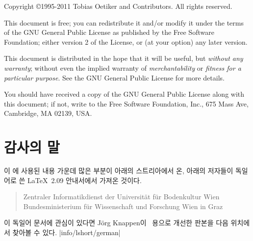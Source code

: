 \begin{small} 
  \noindent Copyright \copyright 1995-2011 Tobias Oetiker and Contributors.  All rights reserved.
 
  This document is free; you can redistribute it and/or modify it
  under the terms of the GNU General Public License as published by
  the Free Software Foundation; either version 2 of the License, or
  (at your option) any later version.
  
  This document is distributed in the hope that it will be useful, but
  \emph{without any warranty}; without even the implied warranty of
  \emph{merchantability} or \emph{fitness for a particular purpose}\@.  See the GNU
  General Public License for more details.
  
  You should have received a copy of the GNU General Public License
  along with this document; if not, write to the Free Software
  Foundation, Inc., 675 Mass Ave, Cambridge, MA 02139, USA.

\end{small}

\chapter{감사의 말}
\noindent 이 에 사용된 내용 가운데 많은 부분이 아래의 스트리아에서 온, 아래의 저자들이 독일어로 쓴 \LaTeX\ 2.09 안내서에서 가져온 것이다.

\begin{verse}
%
{Zentraler Informatikdienst der Universit\"at f\"ur Bodenkultur Wien}
%
   {Bundesministerium f\"ur Wissenschaft und Forschung Wien}
%
   {in Graz}
\end{verse}

이 독일어 문서에 관심이 있다면 J\"org Knappen이 \LaTeXe\ 용으로 개선한
판본을 다음 위치에서 찾아볼 수 있다.
\CTAN|info/lshort/german|

